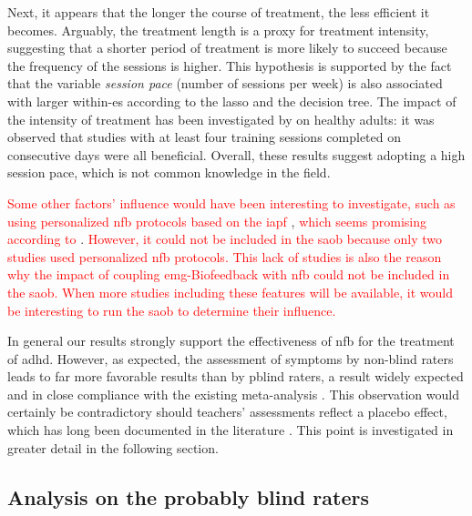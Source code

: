 Next, it appears that the longer the course of treatment, the less efficient it becomes. Arguably, the treatment length is a
proxy for treatment intensity, suggesting that a shorter period of treatment is more likely to succeed because the frequency of the sessions
is higher. This hypothesis is supported by the fact that the variable \emph{session pace} (number of
sessions per week) is also associated with larger within-\gls{es} according to the \gls{lasso} and the decision tree. The impact of the
intensity of treatment has been investigated by \citep{Rogala2016} on healthy adults: it was observed that studies with
at least four training sessions completed on consecutive days were all beneficial. Overall, these results suggest adopting a high session pace, 
which is not common knowledge in the field.

\textcolor{red}{Some other factors' influence would have been interesting to investigate, such as using personalized \gls{nfb} protocols based on the 
\gls{iapf}} \citep{Liu2016}, \textcolor{red}{which seems promising according to} \citet{Bazanova2018, Escolano2014}. \textcolor{red}{However, it could not be included in the 
\gls{saob} because only two studies used personalized \gls{nfb} protocols. This lack of studies is also the reason why the impact of coupling \gls{emg}-Biofeedback with \gls{nfb} could not be 
included in the \gls{saob}. When more studies including these features will be available, it would be interesting to run the \gls{saob} to determine their influence.} 

In general our results strongly support the effectiveness of \gls{nfb} for the treatment of \gls{adhd}. However, as expected, 
the assessment of symptoms by non-blind raters leads to far more favorable results than by \gls{pblind} raters, a result 
widely expected and in close compliance with the existing meta-analysis \citep{Cortese2016, Micoulaud2014}. 
This observation would certainly be contradictory should teachers’ 
assessments reflect a placebo effect, which has long been documented in the literature \citep{Sollie2013, Narad2015, Minder2018}. 
This point is investigated in greater detail in the following section.

\subsection{Analysis on the probably blind raters}

